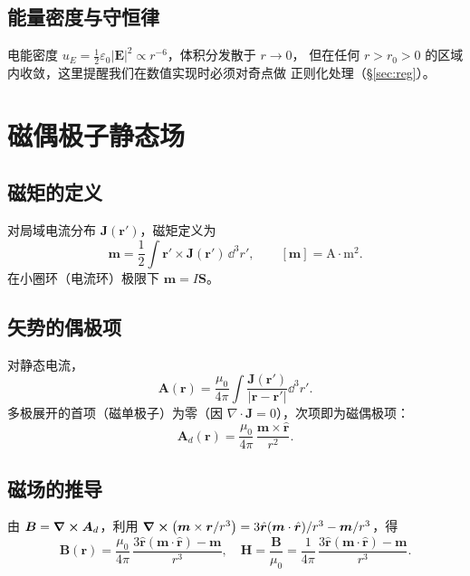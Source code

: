 \documentclass[11pt,a4paper]{article}
\newcommand{\epso}{\varepsilon_{0}}
\newcommand{\muo}{\mu_{0}}
\newcommand{\rhat}{\hat{\bm r}}
\newcommand{\mvec}{\bm m}
\newcommand{\Evec}{\bm E}
\newcommand{\Hvec}{\bm H}
\newcommand{\Bvec}{\bm B}
\newcommand{\Avec}{\bm A}
\newcommand{\Jvec}{\bm J}
\newcommand{\rvec}{\bm r}
\newcommand{\diver}{\nabla\cdot}
\begin{document}
\subsection{能量密度与守恒律}
电能密度 $u_E=\tfrac{1}{2}\epso|\Evec|^{2}\propto r^{-6}$，体积分发散于 $r\to0$，
但在任何 $r>r_{0}>0$ 的区域内收敛，这里提醒我们在数值实现时必须对奇点做
正则化处理（\S\ref{sec:reg}）。

\section{磁偶极子静态场}

\subsection{磁矩的定义}
对局域电流分布 $\Jvec(\rvec')$，磁矩定义为
\begin{equation}
    \mvec = \frac{1}{2}\int \rvec'\times\Jvec(\rvec')\,\dd^{3}r',
    \qquad [\mvec]=\mathrm{A\!\cdot\!m^{2}}.
\end{equation}
在小圈环（电流环）极限下 $\mvec = I\bm S$。

\subsection{矢势的偶极项}
对静态电流，
\begin{equation}
    \Avec(\rvec) = \frac{\muo}{4\pi}\int\frac{\Jvec(\rvec')}{|\rvec-\rvec'|}\dd^{3}r'.
\end{equation}
多极展开的首项（磁单极子）为零（因 $\diver\Jvec=0$），次项即为磁偶极项：
\begin{equation}
    \boxed{\,\Avec_{d}(\rvec)=\frac{\muo}{4\pi}\,\frac{\mvec\times\rhat}{r^{2}}.\,}
\end{equation}

\subsection{磁场的推导}
由 $\Bvec=\curl\Avec_{d}$，利用
$\curl(\mvec\times\rvec/r^{3})=3\rhat(\mvec\cdot\rhat)/r^{3}-\mvec/r^{3}$，得
\begin{equation}
    \boxed{\;
    \Bvec(\rvec)=\frac{\muo}{4\pi}\,\frac{3\rhat(\mvec\cdot\rhat)-\mvec}{r^{3}},
    \quad
    \Hvec=\frac{\Bvec}{\muo}=\frac{1}{4\pi}\,\frac{3\rhat(\mvec\cdot\rhat)-\mvec}{r^{3}}.
    \;}
    \label{eq:H-dipole}
\end{equation}
\end{document}
